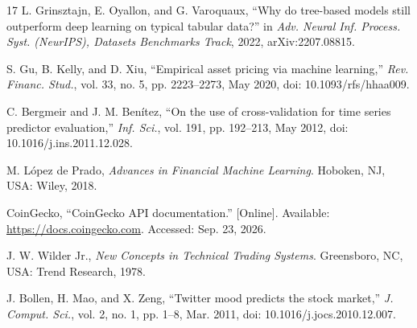 \documentclass[conference]{IEEEtran}
\begin{document}
\begin{thebibliography}{17}
L. Grinsztajn, E. Oyallon, and G. Varoquaux, ``Why do tree-based models still outperform deep learning on typical tabular data?'' in \emph{Adv. Neural Inf. Process. Syst. (NeurIPS), Datasets Benchmarks Track}, 2022, arXiv:2207.08815.

S. Gu, B. Kelly, and D. Xiu, ``Empirical asset pricing via machine learning,'' \emph{Rev. Financ. Stud.}, vol. 33, no. 5, pp. 2223--2273, May 2020, doi: 10.1093/rfs/hhaa009.

C. Bergmeir and J. M. Ben\'itez, ``On the use of cross-validation for time series predictor evaluation,'' \emph{Inf. Sci.}, vol. 191, pp. 192--213, May 2012, doi: 10.1016/j.ins.2011.12.028.

M. L\'opez de Prado, \emph{Advances in Financial Machine Learning}. Hoboken, NJ, USA: Wiley, 2018.

CoinGecko, ``CoinGecko API documentation.'' [Online]. Available: \url{https://docs.coingecko.com}. Accessed: Sep. 23, 2026.

J. W. Wilder Jr., \emph{New Concepts in Technical Trading Systems}. Greensboro, NC, USA: Trend Research, 1978.

J. Bollen, H. Mao, and X. Zeng, ``Twitter mood predicts the stock market,'' \emph{J. Comput. Sci.}, vol. 2, no. 1, pp. 1--8, Mar. 2011, doi: 10.1016/j.jocs.2010.12.007.

\end{thebibliography}
\end{document}
